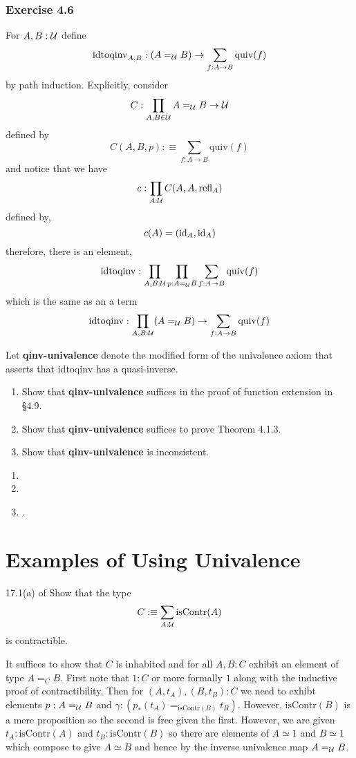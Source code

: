 \documentclass[12pt]{article}
\begin{document}
\subsubsection{Exercise 4.6}

\newcommand{\qinv}{\mathrm{quiv}}

\begin{exercise}
For $A, B : \mathcal{U}$ define
\[ \mathrm{idtoqinv}_{A,B} : (A =_{\cU} B) \to \sum_{f : A \to B} \qinv(f) \] 
by path induction. Explicitly, consider
\[ C : \prod_{A,B \in \mathcal{U}} A =_{\mathcal{U}} B \to \mathcal{U} \]
defined by 
\[ C(A,B,p) :\equiv \sum_{f : A \to B} \qinv(f) \]
and notice that we have
\[ c : \prod_{A : \mathcal{U}} C(A, A, \mathrm{refl}_A) \]
defined by,
\[ c(A) = (\mathrm{id}_A, \mathrm{id}_A) \]
therefore, there is an element,
\[ \mathrm{idtoqinv} : \prod_{A, B : \cU} \prod_{p : A =_{\cU} B} \sum_{f : A \to B} \qinv(f) \]
which is the same as an a term
\[ \mathrm{idtoqinv} : \prod_{A, B : \cU} (A =_{\cU} B) \to \sum_{f : A \to B} \qinv(f) \]

Let \textbf{qinv-univalence} denote the modified form of the univalence axiom that asserts that $\mathrm{idtoqinv}$ has a quasi-inverse.

\begin{enumerate}
\item Show that \textbf{qinv-univalence} suffices in the proof of function extension in \S 4.9.
\item Show that \textbf{qinv-univalence} suffices to prove Theorem 4.1.3.
\item Show that \textbf{qinv-univalence} is inconsistent.
\end{enumerate}
\end{exercise}

\begin{enumerate}
\item 
\item 
\item {}.
\end{enumerate}


\section{Examples of Using Univalence}

\begin{exercise} 17.1(a) of 
Show that the type
\[ C :\equiv \sum_{A : \mathcal{U}} \text{isContr}(A) \]
is contractible.
\end{exercise}

It suffices to show that $C$ is inhabited and for all $A, B : C$ exhibit an element of type $A =_C B$. First note that $1 : C$ or more formally $1$ along with the inductive proof of contractibility. Then for $(A, t_A), (B, t_B) : C$ we need to exhibt elements $p : A =_{\mathcal{U}} B$ and $\gamma : (p_*(t_A) =_{\text{isContr}(B)} t_B)$. However, $\text{isContr}(B)$ is a mere proposition so the second is free given the first. However, we are given $t_A : \text{isContr}(A)$ and $t_B : \text{isContr}(B)$ so there are elements of $A \simeq 1$ and $B \simeq 1$ which compose to give $A \simeq B$ and hence by the inverse univalence map $A =_{\mathcal{U}} B$.
\end{document}
